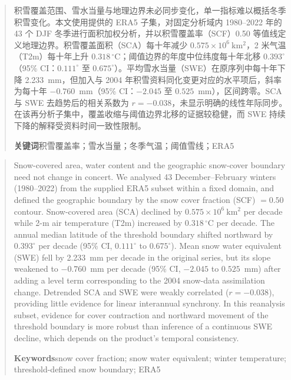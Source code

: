 \begin{abstract}
积雪覆盖范围、雪水当量与地理边界未必同步变化，单一指标难以概括冬季积雪变化。本文使用提供的 ERA5 子集，对固定分析域内 1980--2022 年的 43 个 DJF 冬季进行面积加权分析，并以积雪覆盖率（SCF）0.50 等值线定义地理边界。积雪覆盖面积（SCA）每十年减少 $0.575\times10^6~\mathrm{km^2}$，2 米气温（T2m）每十年上升 $0.318\,^\circ$C；阈值边界的年度中位纬度每十年北移 $0.393^\circ$（95\% CI：$0.111^\circ$ 至 $0.675^\circ$）。平均雪水当量（SWE）在原序列中每十年下降 2.233~mm，但加入与 2004 年积雪资料同化变更对应的水平项后，斜率为每十年 $-0.760$~mm（95\% CI：$-2.045$ 至 $0.525$~mm），区间跨零。SCA 与 SWE 去趋势后的相关系数为 $r=-0.038$，未显示明确的线性年际同步。在该再分析子集中，覆盖收缩与阈值边界北移的证据较稳健，而 SWE 持续下降的解释受资料时间一致性限制。

\noindent\textbf{关键词}\quad 积雪覆盖率；雪水当量；冬季气温；阈值雪线；ERA5
\end{abstract}

\begingroup
\renewcommand{\abstractname}{\textbf{\large Abstract}}
\begin{abstract}
Snow-covered area, water content and the geographic snow-cover boundary need not change in concert. We analysed 43 December--February winters (1980--2022) from the supplied ERA5 subset within a fixed domain, and defined the geographic boundary by the snow cover fraction (SCF) $=0.50$ contour. Snow-covered area (SCA) declined by $0.575\times10^6~\mathrm{km^2}$ per decade while 2-m air temperature (T2m) increased by $0.318\,^\circ$C per decade. The annual median latitude of the threshold boundary shifted northward by $0.393^\circ$ per decade (95\% CI, $0.111^\circ$ to $0.675^\circ$). Mean snow water equivalent (SWE) fell by 2.233~mm per decade in the original series, but its slope weakened to $-0.760$~mm per decade (95\% CI, $-2.045$ to $0.525$~mm) after adding a level term corresponding to the 2004 snow-data assimilation change. Detrended SCA and SWE were weakly correlated ($r=-0.038$), providing little evidence for linear interannual synchrony. In this reanalysis subset, evidence for cover contraction and northward movement of the threshold boundary is more robust than inference of a continuous SWE decline, which depends on the product's temporal consistency.

\noindent\textbf{Keywords}\quad snow cover fraction; snow water equivalent; winter temperature; threshold-defined snow boundary; ERA5
\end{abstract}
\endgroup

